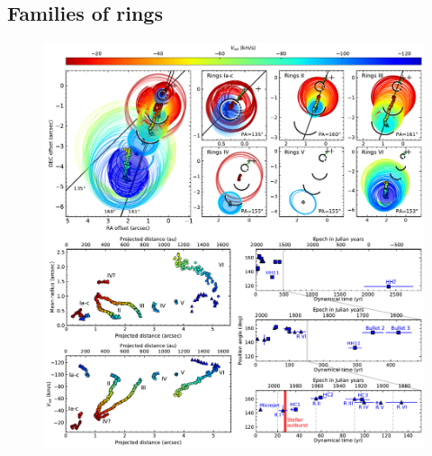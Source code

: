 \documentclass[12pt]{mythesis}
\begin{document}
\subsection{Families of rings}

\begin{figure}[p!] 
\begin{center}
\includegraphics[width=1\textwidth]{figures/ellipsefits.pdf}
\end{center}
\end{figure}
\end{document}
